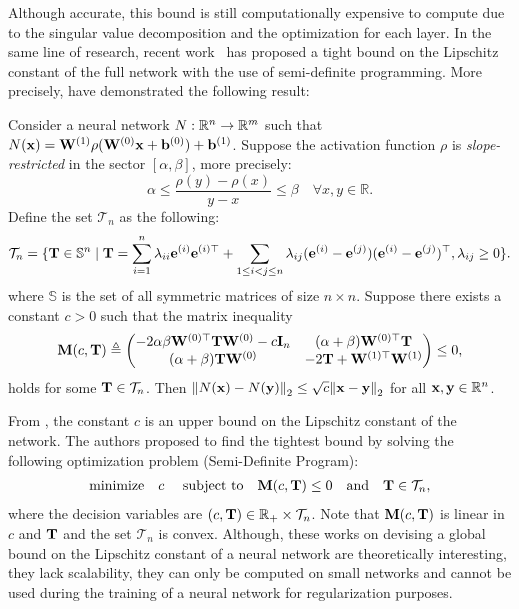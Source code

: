 Although accurate, this bound is still computationally expensive to compute due to the singular value decomposition and the optimization for each layer. 
In the same line of research, recent work~\cite{fazlyab2019safety,fazlyab2019efficient,latorre2020lipschitz} has proposed a tight bound on the Lipschitz constant of the full network with the use of semi-definite programming.
More precisely, \citet{fazlyab2019efficient} have demonstrated the following result:
\begin{theorem}
  Consider a neural network $N: \mathbb{R}^n \rightarrow \mathbb{R}^m$ such that $N(\mathbf{x}) = \mathbf{W}^{(1)} \rho(\mathbf{W}^{(0)} \mathbf{x} + \mathbf{b}^{(0)}) + \mathbf{b}^{(1)}$.
  Suppose the activation function $\rho$ is \emph{slope-restricted} in the sector $[\alpha,\beta]$, more precisely:
  \begin{equation}
    \alpha \leq \frac{\rho(y) - \rho(x)}{y-x} \leq \beta \quad \forall x,y \in \mathbb{R}. 
  \end{equation}
  Define the set $\mathcal{T}_{n}$ as the following:
  \begin{equation*}
    \mathcal{T}_n = \{\mathbf{T} \in \mathbb{S}^n \mid \mathbf{T} = \sum_{i=1}^{n} \lambda_{ii} \mathbf{e}^{(i)} \mathbf{e}^{(i)\top} + \sum_{1 \leq i<j \leq n} \lambda_{ij}(\mathbf{e}^{(i)} - \mathbf{e}^{(j)})(\mathbf{e}^{(i)}-\mathbf{e}^{(j)})^\top, \lambda_{ij} \geq 0 \}.
  \end{equation*}
  where $\mathbb{S}$ is the set of all symmetric matrices of size $n \times n$.
  Suppose there exists a constant $c>0$ such that the matrix inequality
  \begin{align}
    \mathbf{M}(c,\mathbf{T}) \triangleq
      \begin{pmatrix}
      -2\alpha \beta \mathbf{W}^{(0)\top} \mathbf{T} \mathbf{W}^{(0)} - c \mathbf{I}_n & (\alpha+\beta) \mathbf{W}^{(0)\top} \mathbf{T}  \\
      (\alpha+\beta) \mathbf{T} \mathbf{W}^{(0)} & -2\mathbf{T}+\mathbf{W}^{(1)\top} \mathbf{W}^{(1)}
      \end{pmatrix}
      \leq 0,
  \end{align}
  holds for some $\mathbf{T} \in \mathcal{T}_{n}$. Then $\norm{N(\mathbf{x})-N(\mathbf{y})}_2 \leq \sqrt{c} \norm{\mathbf{x}-\mathbf{y}}_2$ for all  $\mathbf{x},\mathbf{y} \in \mathbb{R}^n$.
  \label{theorem:ch3-lipschite_semidefinite_programming}
\end{theorem}
\noindent
From , the constant $c$ is an upper bound on the Lipschitz constant of the network.
The authors proposed to find the tightest bound by solving the following optimization problem (Semi-Definite Program):
\begin{align} \label{eq: SDP one layer}
  \textrm{minimize} \quad c \quad \text{ subject to} \quad \mathbf{M}(c,\mathbf{T}) \leq 0 \quad \text{and} \quad \mathbf{T} \in \mathcal{T}_{n},
\end{align}
where the decision variables are $(c,\mathbf{T}) \in \mathbb{R}_+ \times \mathcal{T}_n$.
Note that $\mathbf{M}(c,\mathbf{T})$ is linear in $c$ and $\mathbf{T}$ and the set $\mathcal{T}_n$ is convex.
Although, these works on devising a global bound on the Lipschitz constant of a neural network are theoretically interesting, they lack scalability, they can only be computed on small networks and cannot be used during the training of a neural network for regularization purposes.

